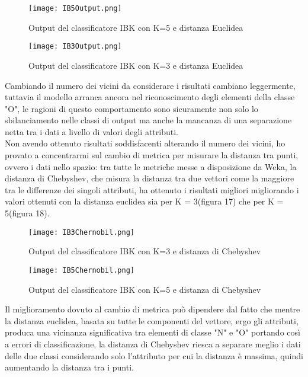 \begin{figure}[H]
	\texttt{[image: IB5Output.png]}
	\caption{Output del classificatore IBK con K=5 e distanza Euclidea}
\end{figure}

\begin{figure}[H]
	\texttt{[image: IB3Output.png]}
	\caption{Output del classificatore IBK con K=3 e distanza Euclidea}
\end{figure}

Cambiando il numero dei vicini da considerare i risultati cambiano leggermente, tuttavia il modello arranca ancora nel riconoscimento degli elementi della classe "O", le ragioni di questo comportamento sono sicuramente non solo lo sbilanciamento nelle classi di output ma anche la mancanza di una separazione netta tra i dati a livello di valori degli attributi.\\
Non avendo ottenuto risultati soddisfacenti alterando il numero dei vicini, ho provato a concentrarmi sul cambio di metrica per misurare la distanza tra punti, ovvero i dati nello spazio: tra tutte le metriche messe a disposizione da Weka, la distanza di Chebyshev, che misura la distanza tra due vettori come la maggiore tra le differenze dei singoli attributi, ha ottenuto i risultati migliori migliorando i valori ottenuti con la distanza euclidea sia per K = 3(figura 17) che per K = 5(figura 18).

\begin{figure}[H]
	\texttt{[image: IB3Chernobil.png]}
	\caption{Output del classificatore IBK con K=3 e distanza di Chebyshev}
\end{figure} 

\begin{figure}[H]
	\texttt{[image: IB5Chernobil.png]}
	\caption{Output del classificatore IBK con K=5 e distanza di Chebyshev}
\end{figure} 

Il miglioramento dovuto al cambio di metrica può dipendere dal fatto che mentre la distanza euclidea, basata su tutte le componenti del vettore, ergo gli attributi, produca una vicinanza significativa tra elementi di classe "N" e "O" portando così a errori di classificazione, la distanza di Chebyshev riesca a separare meglio i dati delle due classi considerando solo l'attributo per cui la distanza è massima, quindi aumentando la distanza tra i punti.
  
